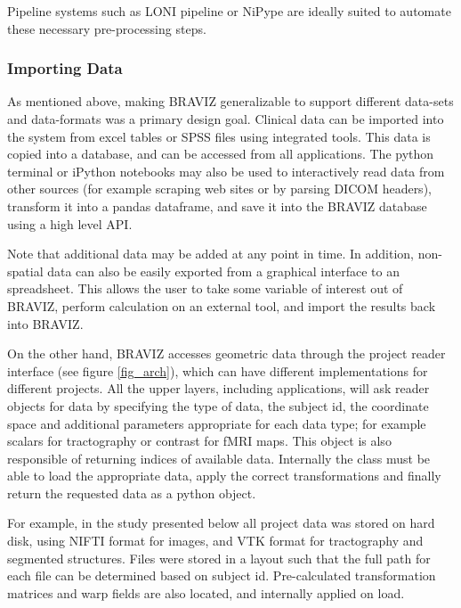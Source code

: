 \documentclass{frontiersHLTH}
\begin{document}
Pipeline systems such as LONI pipeline \cite{dinov_efficient_2009} or NiPype \cite{gorgolewski_nipype:_2011} are ideally suited to automate these necessary pre-processing steps.

\subsubsection{Importing Data}


As mentioned above, making BRAVIZ generalizable to support different data-sets and data-formats was a primary design goal. Clinical data can be imported into the system from excel tables or SPSS files using integrated tools. This data is copied into a database, and can be accessed from all applications. The python terminal or iPython notebooks \cite{perez_ipython:_2007} may also be used to interactively read data from other sources (for example scraping web sites or by parsing DICOM headers), transform it into a pandas dataframe, and save it into the BRAVIZ database using a high level API.

Note that additional data may be added at any point in time. In addition, non-spatial data can also be easily exported from a graphical interface to an spreadsheet. This allows the user to take some variable of interest out of BRAVIZ, perform calculation on an external tool, and import the results back into BRAVIZ.

On the other hand, BRAVIZ accesses geometric data through the project reader interface (see figure \ref{fig_arch}), which can have different implementations for different projects. All the upper layers, including applications, will ask reader objects for data by specifying the type of data, the subject id, the coordinate space  and additional parameters appropriate for each data type; for example scalars for tractography or contrast for fMRI maps. This object is also responsible of returning indices of available data. Internally the class must be able to load the appropriate data, apply the correct transformations and finally return the requested data as a python object. 

For example, in the study presented below all project data was stored on hard disk, using NIFTI format for images, and VTK format for tractography and segmented structures. Files were stored in a layout such that the full path for each file can be determined based on subject id. Pre-calculated transformation matrices and warp fields are also located, and internally applied on load.
\end{document}
